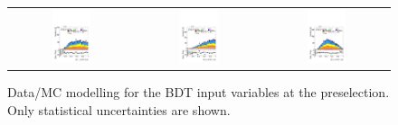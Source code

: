 \begin{figure}[htbp]
  \centering
  \setlength{\tabcolsep}{1.5pt}
  \renewcommand{\arraystretch}{0}

  \begin{tabular}{@{}c c c@{}}
    \includegraphics[width=0.33\textwidth]{images/modelling_tmva_vars/plot_ratio01_hh_tth.pdf} &
    \includegraphics[width=0.33\textwidth]{images/modelling_tmva_vars/plot_ratio12_hh_tth.pdf} &
    \includegraphics[width=0.33\textwidth]{images/modelling_tmva_vars/plot_ratio13_hh_tth.pdf}
  \end{tabular}

  \caption{Data/MC modelling for the \ttH BDT input variables at the \ttHtt preselection. Only statistical uncertainties are shown.}
  \label{tth_vars_modelling_3}
\end{figure}


